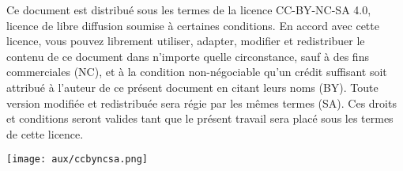 
Ce document est distribu\'{e} sous les termes de la licence CC-BY-NC-SA 4.0, licence de libre diffusion soumise à certaines conditions. En accord avec cette licence, vous pouvez librement utiliser, adapter, modifier et redistribuer le contenu de ce document dans n'importe quelle circonstance, sauf à des fins commerciales (NC), et à la condition non-n\'{e}gociable qu’un cr\'{e}dit suffisant soit attribu\'{e} à l'auteur de ce pr\'{e}sent document en citant leurs noms (BY). Toute version modifi\'{e}e et redistribu\'{e}e sera r\'{e}gie par les m\^{e}mes termes (SA). Ces droits et conditions seront valides tant que le pr\'{e}sent travail sera plac\'{e} sous les termes de cette licence.

\begin{center}
\texttt{[image: aux/ccbyncsa.png]}
\end{center}


\newpage
